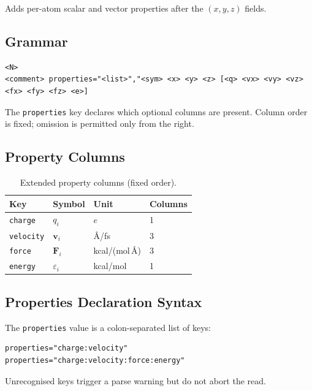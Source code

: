 \documentclass[12pt, a4paper, oneside]{article}
\begin{document}
Adds per-atom scalar and vector properties after the $(x, y, z)$ fields.

\subsection{Grammar}

\begin{lstlisting}[language={},frame=single]
<N>
<comment> properties="<list>","<sym> <x> <y> <z> [<q> <vx> <vy> <vz> <fx> <fy> <fz> <e>]
\end{lstlisting}

The \texttt{properties} key declares which optional columns are present.
Column order is fixed; omission is permitted only from the right.

\subsection{Property Columns}

\begin{table}[htbp]
  \centering
  \caption{Extended property columns (fixed order).}
  \label{tab:xyza_cols}
  \begin{tabular}{llll}
    \toprule
    Key & Symbol & Unit & Columns \\
    \midrule
    \texttt{charge}   & $q_i$          & $e$                   & 1 \\
    \texttt{velocity} & $\mathbf{v}_i$ & \AA/fs                & 3 \\
    \texttt{force}    & $\mathbf{F}_i$ & kcal/(mol\,\AA)       & 3 \\
    \texttt{energy}   & $\varepsilon_i$& kcal/mol              & 1 \\
    \bottomrule
  \end{tabular}
\end{table}

\subsection{Properties Declaration Syntax}

The \texttt{properties} value is a colon-separated list of keys:

\begin{lstlisting}[language={},frame=single]
properties="charge:velocity"
properties="charge:velocity:force:energy"
\end{lstlisting}

Unrecognised keys trigger a parse warning but do not abort the read.
\end{document}
